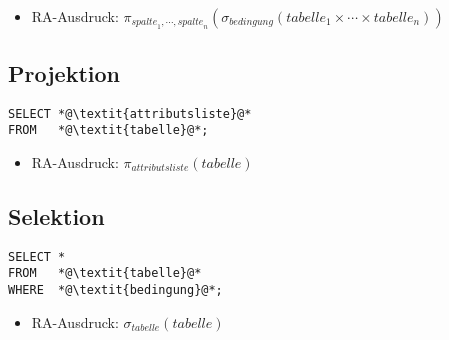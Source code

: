             \begin{itemize}
            	\item RA-Ausdruck: \( \pi_{ \textit{spalte}_1, \cdots, \textit{spalte}_n } ( \sigma _ \textit{bedingung} ( \textit{tabelle}_1 \times \cdots \times \textit{tabelle}_n ) ) \)
            \end{itemize}

        \subsection{Projektion} %
            \begin{lstlisting}
SELECT *@\textit{attributsliste}@*
FROM   *@\textit{tabelle}@*;
            \end{lstlisting}
            
            \begin{itemize}
            	\item RA-Ausdruck: \( \pi _ \textit{attributsliste} (\textit{tabelle}) \)
            \end{itemize}

        \subsection{Selektion} %
            \begin{lstlisting}
SELECT *
FROM   *@\textit{tabelle}@*
WHERE  *@\textit{bedingung}@*;
            \end{lstlisting}
            
            \begin{itemize}
            	\item RA-Ausdruck: \( \sigma _ \textit{tabelle} (\textit{tabelle}) \)
            \end{itemize}

